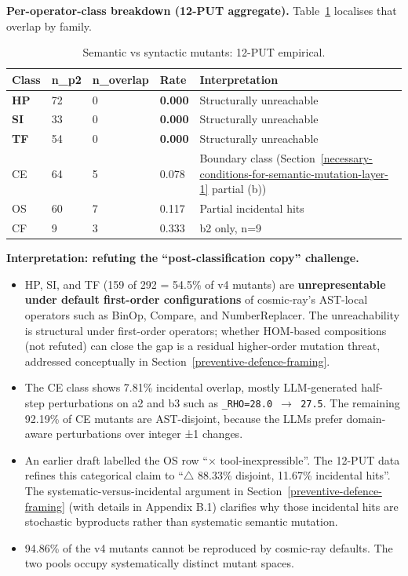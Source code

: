 \documentclass[review,12pt,authoryear]{elsarticle}
\providecommand{\tightlist}{\setlength{\itemsep}{0pt}\setlength{\parskip}{0pt}}
\begin{document}
\textbf{Per-operator-class breakdown (12-PUT aggregate).}
Table~\ref{tab:p2-05} localises that overlap by family.

{\def\LTcaptype{table} %
\begin{longtable}[]{@{}lllll@{}}
\caption{Semantic vs syntactic mutants: 12-PUT empirical.}\label{tab:p2-05}\\
\toprule\noalign{}
Class & n\_p2 & n\_overlap & Rate & Interpretation \\
\midrule\noalign{}
\endfirsthead
\endhead
\bottomrule\noalign{}
\endlastfoot
\textbf{HP} & 72 & 0 & \textbf{0.000} & Structurally unreachable \\
\textbf{SI} & 33 & 0 & \textbf{0.000} & Structurally unreachable \\
\textbf{TF} & 54 & 0 & \textbf{0.000} & Structurally unreachable \\
CE & 64 & 5 & 0.078 & Boundary class (Section~\ref{necessary-conditions-for-semantic-mutation-layer-1} partial (b)) \\
OS & 60 & 7 & 0.117 & Partial incidental hits \\
CF & 9 & 3 & 0.333 & b2 only, n=9 \\
\end{longtable}
}

\textbf{Interpretation: refuting the ``post-classification copy''
challenge.}

\begin{itemize}
\tightlist
\item
  HP, SI, and TF (159 of 292 = 54.5\% of v4 mutants) are
  \textbf{unrepresentable under default first-order configurations} of
  cosmic-ray's AST-local operators such as BinOp, Compare, and
  NumberReplacer. The unreachability is structural under first-order
  operators; whether HOM-based compositions \citep{jia2008subtle} (not
  refuted) can close the gap is a residual higher-order mutation threat, addressed
  conceptually in Section~\ref{preventive-defence-framing}.
\item
  The CE class shows 7.81\% incidental overlap, mostly LLM-generated
  half-step perturbations on a2 and b3 such as
  \texttt{\_RHO=28.0\ $\to$\ 27.5}. The remaining 92.19\% of CE mutants are
  AST-disjoint, because the LLMs prefer domain-aware perturbations over
  integer ±1 changes.
\item
  An earlier draft labelled the OS row ``$\times$ tool-inexpressible''. The
  12-PUT data refines this categorical claim to ``$\bigtriangleup$ 88.33\% disjoint,
  11.67\% incidental hits''. The systematic-versus-incidental argument
  in Section~\ref{preventive-defence-framing} (with details in Appendix B.1) clarifies why those
  incidental hits are stochastic byproducts rather than systematic
  semantic mutation.
\item
  94.86\% of the v4 mutants cannot be reproduced by cosmic-ray defaults.
  The two pools occupy systematically distinct mutant spaces.
\end{itemize}
\end{document}
